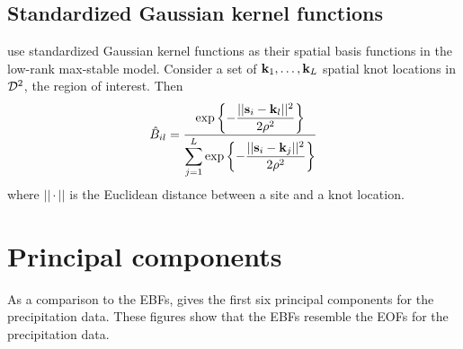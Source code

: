 \documentclass[aoas]{imsart}
\begin{document}
\subsection{Standardized Gaussian kernel functions} \label{eba:gskfunctions}

\citet{Reich2012} use standardized Gaussian kernel functions as their spatial basis functions in the low-rank max-stable model.
Consider a set of $\mathbf{k}_1, \ldots, \mathbf{k}_L$ spatial knot locations in ${\cal D}^2$, the region of interest.
Then
\begin{align}
  \hat{B}_{il} = \frac{\exp\left\{- \displaystyle\frac{||\bs_i - \bk_l||^2}{2 \rho^2} \right\}}{\displaystyle \sum_{j = 1}^L \exp\left\{- \frac{||\bs_i - \bk_j||^2}{2 \rho^2} \right\}}
\end{align}
where $|| \cdot ||$ is the Euclidean distance between a site and a knot location.

\section{Principal components} \label{eba:pca}

As a comparison to the EBFs,   gives the first six principal components for the precipitation data.
These figures show that the EBFs resemble the EOFs  for the precipitation data.
%

\end{document}
